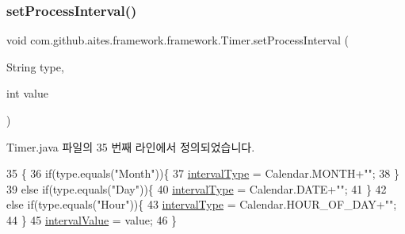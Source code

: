 \mbox{\label{classcom_1_1github_1_1aites_1_1framework_1_1framework_1_1_timer_ab6c30cfb7abd156bb1e42b81eda59d19}} 
\subsubsection{\texorpdfstring{set\+Process\+Interval()}{setProcessInterval()}}
{\footnotesize\ttfamily void com.\+github.\+aites.\+framework.\+framework.\+Timer.\+set\+Process\+Interval (\begin{DoxyParamCaption}\item[{String}]{type,  }\item[{int}]{value }\end{DoxyParamCaption})}



Timer.\+java 파일의 35 번째 라인에서 정의되었습니다.


\begin{DoxyCode}
35                                                           \{
36         \textcolor{keywordflow}{if}(type.equals(\textcolor{stringliteral}{"Month"}))\{
37             \mbox{\hyperlink{classcom_1_1github_1_1aites_1_1framework_1_1framework_1_1_timer_ad5e2632bfab589198a61fafd60f68d18}{intervalType}} = Calendar.MONTH+\textcolor{stringliteral}{""};
38         \}
39         \textcolor{keywordflow}{else} \textcolor{keywordflow}{if}(type.equals(\textcolor{stringliteral}{"Day"}))\{
40             \mbox{\hyperlink{classcom_1_1github_1_1aites_1_1framework_1_1framework_1_1_timer_ad5e2632bfab589198a61fafd60f68d18}{intervalType}} = Calendar.DATE+\textcolor{stringliteral}{""};
41         \}
42         \textcolor{keywordflow}{else} \textcolor{keywordflow}{if}(type.equals(\textcolor{stringliteral}{"Hour"}))\{
43             \mbox{\hyperlink{classcom_1_1github_1_1aites_1_1framework_1_1framework_1_1_timer_ad5e2632bfab589198a61fafd60f68d18}{intervalType}} = Calendar.HOUR\_OF\_DAY+\textcolor{stringliteral}{""};
44         \}
45         \mbox{\hyperlink{classcom_1_1github_1_1aites_1_1framework_1_1framework_1_1_timer_a6c5effea2583bc276ac7c4b1d40e12d7}{intervalValue}} = value;
46     \}
\end{DoxyCode}
\mbox{\label{classcom_1_1github_1_1aites_1_1framework_1_1framework_1_1_timer_a3e6841d35a851c5320aa7d6a3d53db5e}} 
